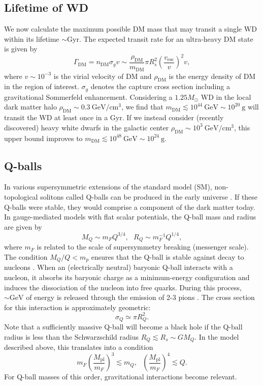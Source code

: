 \documentclass[twocolumn,showpacs,preprintnumbers,amsmath,amssymb,prd]{revtex4}
\newcommand{\GeV}{\text{GeV}}
\newcommand{\Mpl}{M_{\text{pl}}}
\def\r{\right)}
\def\l{\left(}
\begin{document}
\subsection{Lifetime of WD}
We now calculate the maximum possible DM mass that may transit a single WD within its lifetime $\sim \text{Gyr}$. The expected transit rate for an ultra-heavy DM state is given by
\begin{equation}
\Gamma_\text{DM} = n_\text{DM} \sigma_g v \sim \frac{\rho_{\text{DM}}}{m_\text{DM}} \pi R_{s}^2 \l\frac{v_\text{esc}}{v}\r^2 v,
\end{equation}
where $v \sim 10^{-3}$ is the virial velocity of DM and $\rho_{\text{DM}}$ is the energy density of DM in the region of interest. $\sigma_g$ denotes the capture cross section including a gravitational Sommerfeld enhancement. Considering a $1.25 M_{\odot}$ WD in the local dark matter halo $\rho_{\text{DM}} \sim 0.3 ~\text{GeV}/\text{cm}^3$, we find that $m_\text{DM} \lesssim 10^{44} ~\GeV \sim 10^{20} ~\text{g}$ will transit the WD at least once in a Gyr. If we instead consider (recently discovered) heavy white dwarfs in the galactic center $\rho_{\text{DM}} \sim 10^3 ~\text{GeV}/\text{cm}^3$, this upper bound improves to $m_\text{DM} \lesssim 10^{48} ~\GeV \sim 10^{24} ~\text{g}$.

\subsection{Q-balls}
\label{sec:Qballs}
In various supersymmetric extensions of the standard model (SM), non-topological solitons called Q-balls can be produced in the early universe \cite{Coleman:1985ki, Kusenko:1997si}. If these Q-balls were stable, they would comprise a component of the dark matter today. In gauge-mediated models with flat scalar potentials, the Q-ball mass and radius are given by
\begin{equation}
\label{eq:Qballprop}
M_Q \sim m_F Q^{3/4}, ~~~ R_Q \sim m_F^{-1} Q^{1/4},
\end{equation}
where $m_F$ is related to the scale of supersymmetry breaking (messenger scale). The condition $M_Q/Q < m_p$ ensures that the Q-ball is stable against decay to nucleons \cite{Dine:2003ax}. When an (electrically neutral) baryonic Q-ball interacts with a nucleon, it absorbs its baryonic charge as a minimum-energy configuration and induces the dissociation of the nucleon into free quarks. During this process, $\sim \text{GeV}$ of energy is released through the emission of 2-3 pions \cite{Dine:2003ax}. The cross section for this interaction is approximately geometric:
\begin{equation}
\sigma_Q \simeq \pi R_Q^2.
\end{equation}
Note that a sufficiently massive Q-ball will become a black hole if the Q-ball radius is less than the Schwarzschild radius $R_Q \lesssim R_s \sim G M_Q$. In the model described above, this translates into a condition
\begin{equation}
m_F \l\frac{\Mpl}{m_F}\r^3 \lesssim m_Q, ~~~ \l\frac{\Mpl}{m_F}\r^4 \lesssim Q.
\end{equation}
For Q-ball masses of this order, gravitational interactions become relevant.
\end{document}
